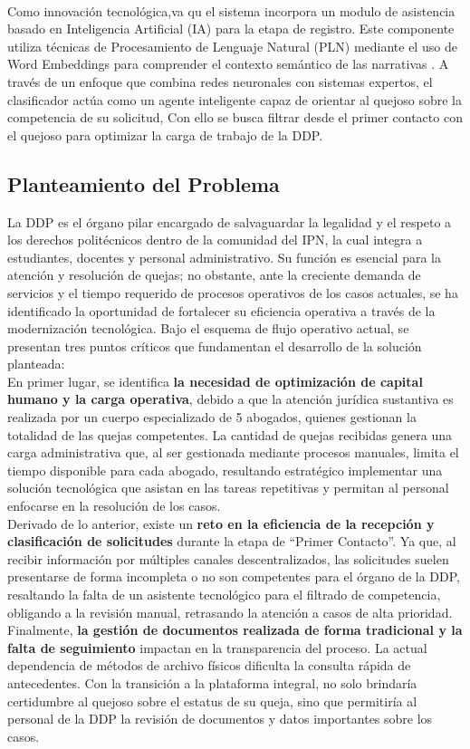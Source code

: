\documentclass[12pt, letterpaper]{article}
\begin{document}
\\
Como innovación tecnológica,va qu el sistema incorpora un modulo de asistencia basado en Inteligencia Artificial (IA) para la etapa de registro. Este componente utiliza técnicas de Procesamiento de Lenguaje Natural (PLN) mediante el uso de Word Embeddings para comprender el contexto semántico de las narrativas \cite{mikolov2013word2vec}. A través de un enfoque que combina redes neuronales con sistemas expertos, el clasificador actúa como un agente inteligente capaz de orientar al quejoso sobre la competencia de su solicitud, Con ello se busca filtrar desde el primer contacto con el quejoso para optimizar la carga de trabajo de la DDP.

\subsection{Planteamiento del Problema}
La DDP es el órgano pilar encargado de salvaguardar la legalidad y el respeto a los derechos politécnicos dentro de la comunidad del IPN, la cual integra a estudiantes, docentes y personal administrativo. Su función es esencial para la atención y resolución de quejas; no obstante, ante la creciente demanda de servicios y el tiempo requerido de procesos operativos de los casos actuales, se ha identificado la oportunidad de fortalecer su eficiencia operativa a través de la modernización tecnológica. Bajo el esquema de flujo operativo actual, se presentan tres puntos críticos que fundamentan el desarrollo de la solución planteada:
\\
En primer lugar, se identifica \textbf{la necesidad de optimización de capital humano y la carga operativa}, debido a que la atención jurídica sustantiva es realizada por un cuerpo especializado de 5 abogados, quienes gestionan la totalidad de las quejas competentes. La cantidad de quejas recibidas genera una carga administrativa que, al ser gestionada mediante procesos manuales, limita el tiempo disponible para cada abogado, resultando estratégico implementar una solución tecnológica que asistan en las tareas repetitivas y permitan al personal enfocarse en la resolución de los casos.
\\
Derivado de lo anterior, existe un \textbf{reto en la eficiencia de la recepción y clasificación de solicitudes} durante la etapa de “Primer Contacto”. Ya que, al recibir información por múltiples canales descentralizados, las solicitudes suelen presentarse de forma incompleta o no son competentes para el órgano de la DDP, resaltando la falta de un asistente tecnológico para el filtrado de competencia, obligando a la revisión manual, retrasando la atención a casos de alta prioridad.
\\
Finalmente, \textbf{la gestión de documentos realizada de forma tradicional y la falta de seguimiento} impactan en la transparencia del proceso. La actual dependencia de métodos de archivo físicos dificulta la consulta rápida de antecedentes. Con la transición a la plataforma integral, no solo brindaría certidumbre al quejoso sobre el estatus de su queja, sino que permitiría al personal de la DDP la revisión de documentos y datos importantes sobre los casos.
\end{document}
